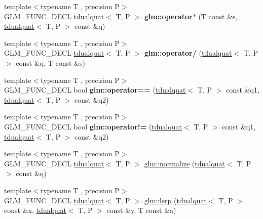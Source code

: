 \begin{DoxyCompactItemize}
{\footnotesize template$<$typename T , precision P$>$ }\\G\+L\+M\+\_\+\+F\+U\+N\+C\+\_\+\+D\+E\+CL \hyperlink{structglm_1_1tdualquat}{tdualquat}$<$ T, P $>$ {\bfseries glm\+::operator$\ast$} (T const \&s, \hyperlink{structglm_1_1tdualquat}{tdualquat}$<$ T, P $>$ const \&q)
\item 
\mbox{\label{group__gtx__dual__quaternion_gad27b1d064624dd6ff1ecc205616323ba}} 
{\footnotesize template$<$typename T , precision P$>$ }\\G\+L\+M\+\_\+\+F\+U\+N\+C\+\_\+\+D\+E\+CL \hyperlink{structglm_1_1tdualquat}{tdualquat}$<$ T, P $>$ {\bfseries glm\+::operator/} (\hyperlink{structglm_1_1tdualquat}{tdualquat}$<$ T, P $>$ const \&q, T const \&s)
\item 
\mbox{\label{group__gtx__dual__quaternion_ga732a51a3a2029f72dd381210e76a3082}} 
{\footnotesize template$<$typename T , precision P$>$ }\\G\+L\+M\+\_\+\+F\+U\+N\+C\+\_\+\+D\+E\+CL bool {\bfseries glm\+::operator==} (\hyperlink{structglm_1_1tdualquat}{tdualquat}$<$ T, P $>$ const \&q1, \hyperlink{structglm_1_1tdualquat}{tdualquat}$<$ T, P $>$ const \&q2)
\item 
\mbox{\label{group__gtx__dual__quaternion_ga5d256fb73497154924e2cf772411edef}} 
{\footnotesize template$<$typename T , precision P$>$ }\\G\+L\+M\+\_\+\+F\+U\+N\+C\+\_\+\+D\+E\+CL bool {\bfseries glm\+::operator!=} (\hyperlink{structglm_1_1tdualquat}{tdualquat}$<$ T, P $>$ const \&q1, \hyperlink{structglm_1_1tdualquat}{tdualquat}$<$ T, P $>$ const \&q2)
\item 
{\footnotesize template$<$typename T , precision P$>$ }\\G\+L\+M\+\_\+\+F\+U\+N\+C\+\_\+\+D\+E\+CL \hyperlink{structglm_1_1tdualquat}{tdualquat}$<$ T, P $>$ \hyperlink{group__gtx__dual__quaternion_ga495818aa48c23e9e730f87a3c337d1d5}{glm\+::normalize} (\hyperlink{structglm_1_1tdualquat}{tdualquat}$<$ T, P $>$ const \&q)
\item 
{\footnotesize template$<$typename T , precision P$>$ }\\G\+L\+M\+\_\+\+F\+U\+N\+C\+\_\+\+D\+E\+CL \hyperlink{structglm_1_1tdualquat}{tdualquat}$<$ T, P $>$ \hyperlink{group__gtx__dual__quaternion_ga8039b88397ca09275be924a26a806a59}{glm\+::lerp} (\hyperlink{structglm_1_1tdualquat}{tdualquat}$<$ T, P $>$ const \&x, \hyperlink{structglm_1_1tdualquat}{tdualquat}$<$ T, P $>$ const \&y, T const \&a)

\end{DoxyCompactItemize}
